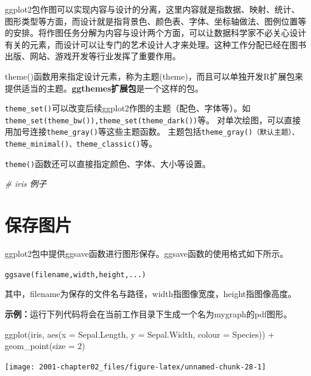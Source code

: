 \documentclass[
]{book}
\newenvironment{Shaded}{\begin{snugshade}}{\end{snugshade}}
\newcommand{\AttributeTok}[1]{\textcolor[rgb]{0.77,0.63,0.00}{#1}}
\newcommand{\CommentTok}[1]{\textcolor[rgb]{0.56,0.35,0.01}{\textit{#1}}}
\newcommand{\DecValTok}[1]{\textcolor[rgb]{0.00,0.00,0.81}{#1}}
\newcommand{\FunctionTok}[1]{\textcolor[rgb]{0.00,0.00,0.00}{#1}}
\newcommand{\NormalTok}[1]{#1}
\newcommand{\SpecialCharTok}[1]{\textcolor[rgb]{0.00,0.00,0.00}{#1}}
\begin{document}
ggplot2包作图可以实现内容与设计的分离，这里内容就是指数据、映射、统计、图形类型等方面，而设计就是指背景色、颜色表、字体、坐标轴做法、图例位置等的安排。将作图任务分解为内容与设计两个方面，可以让数据科学家不必关心设计有关的元素，而设计可以让专门的艺术设计人才来处理。这种工作分配已经在图书出版、网站、游戏开发等行业发挥了重要作用。

theme()函数用来指定设计元素，称为主题(theme)，而且可以单独开发R扩展包来提供适当的主题。\textbf{ggthemes扩展包}是一个这样的包。

\texttt{theme\_set()}可以改变后续ggplot2作图的主题（配色、字体等）。如\texttt{theme\_set(theme\_bw()),theme\_set(theme\_dark())}等。
对单次绘图，可以直接用加号连接\texttt{theme\_gray()}等这些主题函数。
主题包括\texttt{theme\_gray()（默认主题）、theme\_minimal()、theme\_classic()}等。

\texttt{theme()}函数还可以直接指定颜色、字体、大小等设置。

\begin{Shaded}
\begin{Highlighting}[]
\CommentTok{\# iris 例子}
\end{Highlighting}
\end{Shaded}

\hypertarget{ux4fddux5b58ux56feux7247}{%
\section{保存图片}\label{ux4fddux5b58ux56feux7247}}

ggplot2包中提供ggsave函数进行图形保存。ggsave函数的使用格式如下所示。

\texttt{ggsave(filename,width,height,...)}

其中，filename为保存的文件名与路径，width指图像宽度，height指图像高度。

\textbf{示例：}运行下列代码将会在当前工作目录下生成一个名为mygraph的pdf图形。

\begin{Shaded}
\begin{Highlighting}[]
\FunctionTok{ggplot}\NormalTok{(iris, }\FunctionTok{aes}\NormalTok{(}\AttributeTok{x =}\NormalTok{ Sepal.Length, }\AttributeTok{y =}\NormalTok{ Sepal.Width, }\AttributeTok{colour =}\NormalTok{ Species)) }\SpecialCharTok{+} \FunctionTok{geom\_point}\NormalTok{(}\AttributeTok{size =} \DecValTok{2}\NormalTok{)}
\end{Highlighting}
\end{Shaded}

\begin{center}\texttt{[image: 2001-chapter02\_files/figure-latex/unnamed-chunk-28-1]} \end{center}
\end{document}
